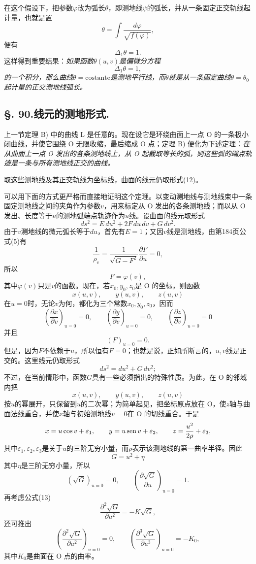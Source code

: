 在这个假设下，把参数\(\varphi\)改为弧长\(\theta\)，即测地线\(\psi\)的弧长，并从一条固定正交轨线起计量，也就是置
\[
 \theta=\int\frac{d\varphi}{\sqrt{f(\varphi)}},
\]
便有
\[
 \Delta_1\theta=1.
\]
这样得到重要结果：\emph{如果函数\(\theta(u,v)\)是偏微分方程}
\[
 \Delta_1\theta=1,
\]
\emph{的一个积分，那么曲线\(\theta=\mathrm{costante}\)是测地平行线，而\(\theta\)就是从一条固定曲线\(\theta=\theta_0\)起计量的正交测地线弧长。}

\subsection*{\S. 90.\quad 线元的测地形式.}

上一节定理 B) 中的曲线 L 是任意的。现在设它是环绕曲面上一点 O 的一条极小闭曲线，并使它围绕 O 无限收缩，最后缩成 O 点；定理 B) 便化为下述定理：\emph{在从曲面上一点 O 发出的各条测地线上，从 O 起截取等长的弧，则这些弧的端点轨迹是一条与所有测地线正交的曲线。}

取这些测地线及其正交轨线为坐标线，曲面的线元仍取形式(12)。

可以用下面的方式更严格而直接地证明这个定理。以变动测地线与测地线束中一条固定测地线之间的夹角作为参数\(v\)，用来标定从 O 发出的各条测地线；而以从 O 发出、长度等于\(u\)的测地弧端点轨迹作为\(u\)线。设曲面的线元取形式
\[
 ds^2=E\,du^2+2F\,du\,dv+G\,dv^2.
\]
由于\(v\)测地线的微元弧长等于\(du\)，首先有\(E=1\)；又因\(v\)线是测地线，由第184页公式(5)有
\[
 \frac1{\rho_v}=\frac1{\sqrt{G-F^2}}\frac{\partial F}{\partial u}=0,
\]
所以
\[
 F=\varphi(v),
\]
其中\(\varphi(v)\)只是\(v\)的函数。现在，若\(x_0,y_0,z_0\)是 O 的坐标，则函数
\[
 x(u,v),\qquad y(u,v),\qquad z(u,v)
\]
在\(u=0\)时，无论\(v\)为何，都化为三个常数\(x_0,y_0,z_0\)，因而
\[
 \left(\frac{\partial x}{\partial v}\right)_{u=0}=0,
 \qquad
 \left(\frac{\partial y}{\partial v}\right)_{u=0}=0,
 \qquad
 \left(\frac{\partial z}{\partial v}\right)_{u=0}=0
\]
并且
\[
 \left(F\right)_{u=0}=0.
\]
但是，因为\(F\)不依赖于\(u\)，所以恒有\(F=0\)；也就是说，正如所断言的，\(u,v\)线是正交的。这里线元仍取形式
\[
 ds^2=du^2+G\,dv^2;
\]
不过，在当前情形中，函数\(G\)具有一些必须指出的特殊性质。为此，在 O 的邻域内把
\[
 x(u,v),\qquad y(u,v),\qquad z(u,v)
\]
按\(u\)的幂展开，只保留到\(u\)的二次幂；为简单起见，把坐标原点放在 O，使\(z\)轴与曲面法线重合，并使\(x\)轴与初始测地线\(v=0\)在 O 的切线重合。于是
\[
 x=u\cos v+\varepsilon_1,
 \qquad
 y=u\operatorname{sen} v+\varepsilon_2,
 \qquad
 z=\frac{u^2}{2\rho}+\varepsilon_3,
\]
其中\(\varepsilon_1,\varepsilon_2,\varepsilon_3\)是关于\(u\)的三阶无穷小量，而\(\rho\)表示该测地线的第一曲率半径。因此
\[
 G=u^2+\eta
\]
其中\(\eta\)是三阶无穷小量，所以
\[
 \left(\sqrt G\right)_{u=0}=0,
 \qquad
 \left(\frac{\partial\sqrt G}{\partial u}\right)_{u=0}=1.
\]
再考虑公式(13)
\[
 \frac{\partial^2\sqrt G}{\partial u^2}=-K\sqrt G,
\]
还可推出
\[
 \left(\frac{\partial^2\sqrt G}{\partial u^2}\right)_{u=0}=0,
 \qquad
 \left(\frac{\partial^3\sqrt G}{\partial u^3}\right)_{u=0}=-K_0,
\]
其中\(K_0\)是曲面在 O 点的曲率。

